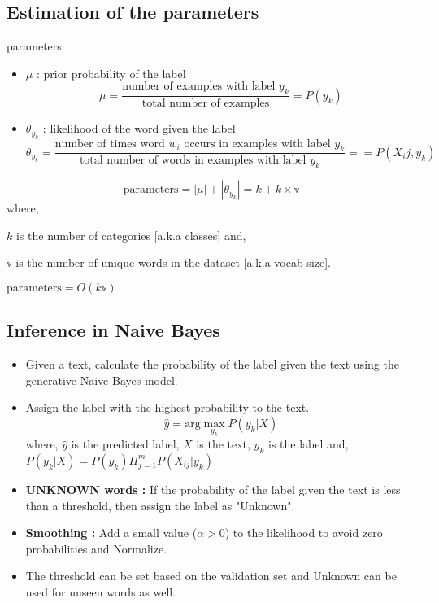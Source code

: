 \subsection{Estimation of the parameters}
parameters :
\begin{itemize}
	\item $\mu$ : prior probability of the label
	$$\mu = \frac{\text{number of examples with label } y_k}{\text{total number of examples}} = P(y_k) $$
	\item $\theta_{y_k}$ : likelihood of the word given the label
	$$\theta_{y_k} = \frac{\text{number of times word } w_i \text{ occurs in examples with label } y_k}{\text{total number of words in examples with label } y_k} = = P(X_ij, y_k) $$
\end{itemize}

$$
\text{parameters} = |\mu| + |\theta_{y_k}| = k + k \times \mathbb{v}
$$
\noindent where,

$k$ is the number of categories [a.k.a classes] and,

$\mathbb{v}$ is the number of unique words in the dataset [a.k.a vocab size].


\noindent $\text{parameters} = O(k \mathbb{v})$

\subsection{Inference in Naive Bayes}
\begin{itemize}
	\item Given a text, calculate the probability of the label given the text using the generative Naive Bayes model.
	\item Assign the label with the highest probability to the text.
		$$
		\hat{y} = \text{arg} \max_{y_k} P(y_k|X)
		$$
		where, $\hat{y}$ is the predicted label, $X$ is the text, $y_k$ is the label and, $ \displaystyle P(y_k | X) = P(y_k) \Pi_{j = 1}^{m} P(X_{ij} | y_k)$
	\item {\bf UNKNOWN words :} If the probability of the label given the text is less than a threshold, then assign the label as "Unknown".
	\item {\bf Smoothing :} Add a small value ($\alpha > 0$) to the likelihood to avoid zero probabilities and Normalize. 
	\item The threshold can be set based on the validation set and Unknown can be used for unseen words as well.
\end{itemize}




